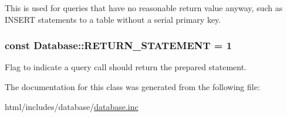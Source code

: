 This is used for queries that have no reasonable return value anyway, such as INSERT statements to a table without a serial primary key. \hypertarget{classDatabase_a7b7c6f8f81159b97752412e439d957dc}{
\subsubsection[{RETURN\_\-STATEMENT}]{\setlength{\rightskip}{0pt plus 5cm}const {\bf Database::RETURN\_\-STATEMENT} = 1}}
\label{classDatabase_a7b7c6f8f81159b97752412e439d957dc}
Flag to indicate a query call should return the prepared statement. 

The documentation for this class was generated from the following file:\begin{DoxyCompactItemize}
\item 
html/includes/database/\hyperlink{database_8inc}{database.inc}\end{DoxyCompactItemize}

